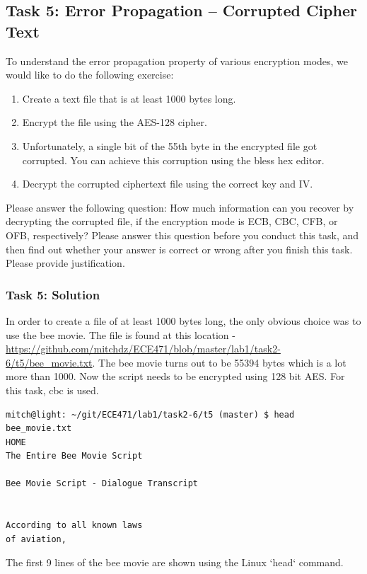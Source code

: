 \documentclass[12pt]{article}
\newcommand\tab[1][0.5cm]{\hspace*{#1}}
\begin{document}
\clearpage
\subsection{Task 5: Error Propagation – Corrupted Cipher Text}
To understand the error propagation property of various encryption modes, we would like to do the
following exercise:
\begin{enumerate}
    \item Create a text file that is at least 1000 bytes long.
    \item Encrypt the file using the AES-128 cipher.
    \item Unfortunately, a single bit of the 55th byte in the encrypted file got corrupted. You can
    achieve this corruption using the bless hex editor.
    \item Decrypt the corrupted ciphertext file using the correct key and IV.
\end{enumerate}
\tab Please answer the following question: How much information can you recover by decrypting the corrupted file, if the encryption mode is ECB, CBC, CFB, or OFB, respectively? Please answer this question before you conduct this task, and then find out whether your answer is correct or wrong after you finish this task. Please provide justification.

\subsubsection{Task 5: Solution}

In order to create a file of at least 1000 bytes long, the only obvious choice was to use the bee movie. The file is found at this location - \url{https://github.com/mitchdz/ECE471/blob/master/lab1/task2-6/t5/bee_movie.txt}. The bee movie turns out to be 55394 bytes which is a lot more than 1000. Now the script needs to be encrypted using 128 bit AES. For this task, cbc is used.

\begin{verbatim}
mitch@light: ~/git/ECE471/lab1/task2-6/t5 (master) $ head bee_movie.txt
HOME
The Entire Bee Movie Script

Bee Movie Script - Dialogue Transcript


According to all known laws
of aviation,

\end{verbatim}

The first  9 lines of the bee movie are shown using the Linux `head` command.
\end{document}
